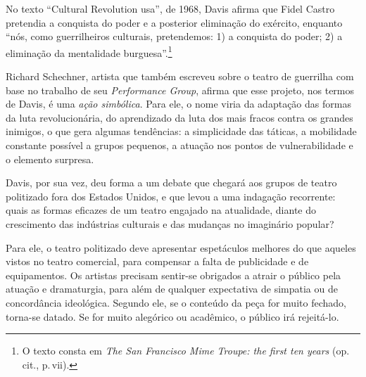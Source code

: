 
No texto “Cultural Revolution {\sc usa}”, de 1968, Davis afirma que
Fidel Castro pretendia a conquista do poder e a posterior eliminação do
exército, enquanto “nós, como guerrilheiros culturais, pretendemos: 1) a
conquista do poder; 2) a eliminação da mentalidade burguesa”.\footnote{O
  texto consta em {\it The San Francisco Mime Troupe: the
  first ten years} (op.\,cit., p.\,vii).}

Richard Schechner, artista que também escreveu sobre o teatro de
guerrilha com base no trabalho de seu {\it Performance Group},
afirma que esse projeto, nos termos de Davis, é uma {\it ação
simbólica}. Para ele, o nome viria da adaptação das formas da luta
revolucionária, do aprendizado da luta dos mais fracos contra os grandes
inimigos, o que gera algumas tendências: a simplicidade das táticas, a
mobilidade constante possível a grupos pequenos, a atuação nos pontos de
vulnerabilidade e o elemento surpresa.

Davis, por sua vez, deu forma a um debate que chegará aos grupos de
teatro politizado fora dos Estados Unidos, e que levou a uma indagação
recorrente: quais as formas eficazes de um teatro engajado na
atualidade, diante do crescimento das indústrias culturais e das
mudanças no imaginário popular?

Para ele, o teatro politizado deve
apresentar espetáculos melhores do que aqueles vistos no teatro
comercial, para compensar a falta de publicidade e de equipamentos. Os
artistas precisam sentir-se obrigados a atrair o público pela atuação e
dramaturgia, para além de qualquer expectativa de simpatia ou de
concordância ideológica. Segundo ele, se o conteúdo da peça for muito
fechado, torna-se datado. Se for muito alegórico ou acadêmico, o público
irá rejeitá-lo.

